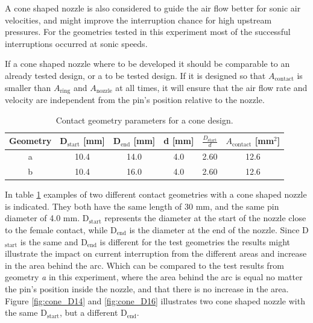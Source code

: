 \documentclass[10pt,a4paper]{article}
\begin{document}
A cone shaped nozzle is also considered to guide the air flow better for sonic air velocities, and might improve the interruption chance for high upstream pressures. For the geometries tested in this experiment most of the successful interruptions occurred at sonic speeds.

If a cone shaped nozzle where to be developed it should be comparable to an already tested design, or a to be tested design. If it is designed so that $A_\mathrm{{contact}}$ is smaller than $A_\mathrm{{ring}}$ and $A_\mathrm{{nozzle}}$ at all times, it will ensure that the air flow rate and velocity are independent from the pin's position relative to the nozzle. 

\begin{table}[H]
\center
\caption{Contact geometry parameters for a cone design.}
 \begin{tabular}{|c|c|c|c|c|c|}
\hline 
Geometry & D$_\mathrm{{start}}$ [mm]& D$_\mathrm{{end}}$ [mm] & d [mm] & $\frac{D_\mathrm{{start}}}{d}$ & $A_\mathrm{{contact}}$ [mm$^2$] \\ 
\hline 
a & 10.4 & 14.0 & 4.0 & 2.60 & 12.6  \\ 
\hline 
b & 10.4 & 16.0 & 4.0 & 2.60 & 12.6  \\ 
\hline 
\end{tabular} 
\label{tab:contGeoParaCone}
\end{table}

In table \ref{tab:contGeoParaCone} examples of two different contact geometries with a cone shaped nozzle is indicated. They both have the same length of 30 mm, and the same pin diameter of 4.0 mm. D$_\mathrm{{start}}$ represents the diameter at the start of the nozzle close to the female contact, while D$_\mathrm{{end}}$ is the diameter at the end of the nozzle. Since D$_\mathrm{{start}}$ is the same and D$_\mathrm{{end}}$ is different for the test geometries the results might illustrate the impact on current interruption from the different areas and increase in the area behind the arc. Which can be compared to the test results from geometry \textit{a} in this experiment, where the area behind the arc is equal no matter the pin's position inside the nozzle, and that there is no increase in the area. Figure \ref{fig:cone_D14} and \ref{fig:cone_D16} illustrates two cone shaped nozzle with the same  D$_\mathrm{{start}}$, but a different D$_\mathrm{{end}}$. 
\end{document}
